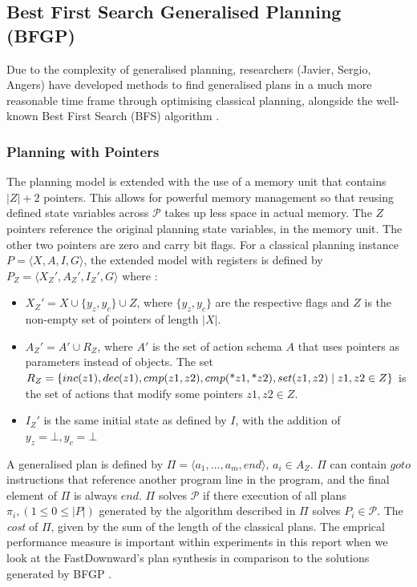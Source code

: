 \subsection{Best First Search Generalised Planning (BFGP)}
Due to the complexity of generalised planning, researchers (Javier, Sergio, Angers) have developed methods to find generalised plans in a much more reasonable time frame through optimising classical planning, alongside the well-known Best First Search (BFS) algorithm \cite{segovia-aguas_generalized_2021}.

\subsubsection{Planning with Pointers}
The planning model is extended with the use of a memory unit that contains $|Z| + 2$ pointers. This allows for powerful memory management so that reusing defined state variables across $\mathcal{P}$ takes up less space in actual memory. The $Z$ pointers reference the original planning state variables, in the memory unit. The other two pointers are zero and carry bit flags. For a classical planning instance $P = \langle X, A, I, G \rangle$, the extended model with registers is defined by $P_Z =\langle X_Z', A_Z', I_Z', G \rangle$ where \cite{segovia-aguas_generalized_2021}:

\begin{itemize}
    \item $X_Z' = X \cup \{y_z, y_c\} \cup Z$, where $\{y_z, y_c\}$ are the respective flags and $Z$ is the non-empty set of pointers of length $|X|$.
    \item $A_Z' = A' \cup R_Z$, where $A'$ is the set of action schema $A$ that uses pointers as parameters instead of objects. The set $R_Z = \{inc(z1), dec(z1), cmp(z1, z2), cmp(\text{*} z1, \text{*} z2), \\set(z1, z2) \mid z1, z2 \in Z\}$ is the set of actions that modify some pointers $z1, z2 \in Z$. 
    \item $I_Z'$ is the same initial state as defined by $I$, with the addition of $y_z = \bot, y_c = \bot$
\end{itemize}

\noindent A generalised plan is defined by $\Pi = \langle a_1, ..., a_m, end \rangle,\, a_i \in A_Z$. $\Pi$ can contain $goto$ instructions that reference another program line in the program, and the final element of $\Pi$ is always $end$. $\Pi$ solves $\mathcal{P}$ if there execution of all plans $\pi_i, (1 \leq 0 \leq |P|) $ generated by the algorithm described in $\Pi$ solves $P_i \in \mathcal{P}$. The \textit{cost} of $\Pi$, given by the sum of the length of the classical plans. The emprical performance measure is important within experiments in this report when we look at the FastDownward's plan synthesis in comparison to the solutions generated by BFGP \cite{segovia-aguas_generalized_2021}.

